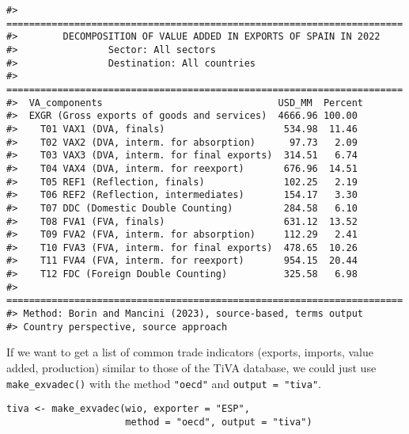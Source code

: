 \begin{verbatim}
#> ======================================================================
#>        DECOMPOSITION OF VALUE ADDED IN EXPORTS OF SPAIN IN 2022
#>                Sector: All sectors
#>                Destination: All countries
#> ======================================================================
#>  VA_components                               USD_MM  Percent
#>  EXGR (Gross exports of goods and services)  4666.96 100.00 
#>    T01 VAX1 (DVA, finals)                     534.98  11.46 
#>    T02 VAX2 (DVA, interm. for absorption)      97.73   2.09 
#>    T03 VAX3 (DVA, interm. for final exports)  314.51   6.74 
#>    T04 VAX4 (DVA, interm. for reexport)       676.96  14.51 
#>    T05 REF1 (Reflection, finals)              102.25   2.19 
#>    T06 REF2 (Reflection, intermediates)       154.17   3.30 
#>    T07 DDC (Domestic Double Counting)         284.58   6.10 
#>    T08 FVA1 (FVA, finals)                     631.12  13.52 
#>    T09 FVA2 (FVA, interm. for absorption)     112.29   2.41 
#>    T10 FVA3 (FVA, interm. for final exports)  478.65  10.26 
#>    T11 FVA4 (FVA, interm. for reexport)       954.15  20.44 
#>    T12 FDC (Foreign Double Counting)          325.58   6.98 
#> ======================================================================
#> Method: Borin and Mancini (2023), source-based, terms output
#> Country perspective, source approach
\end{verbatim}

If we want to get a list of common trade indicators (exports,
imports, value added, production) similar to those of the TiVA database, we
could just use \texttt{make\_exvadec()} with the method \texttt{"oecd"} and
\texttt{output\ =\ "tiva"}.

\begin{verbatim}
tiva <- make_exvadec(wio, exporter = "ESP", 
                     method = "oecd", output = "tiva")
\end{verbatim}


